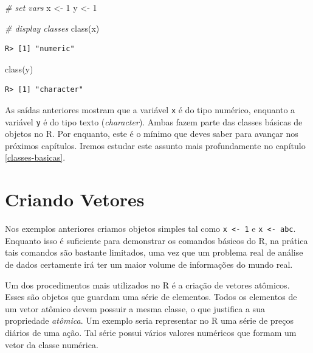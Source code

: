 \documentclass[
  11pt,
]{book}
\newenvironment{Shaded}{\begin{snugshade}}{\end{snugshade}}
\newcommand{\CommentTok}[1]{\textcolor[rgb]{0.37,0.37,0.37}{\textit{#1}}}
\newcommand{\DecValTok}[1]{\textcolor[rgb]{0.06,0.06,0.06}{#1}}
\newcommand{\FunctionTok}[1]{\textcolor[rgb]{0,0,0}{#1}}
\newcommand{\NormalTok}[1]{#1}
\newcommand{\OtherTok}[1]{\textcolor[rgb]{0.37,0.37,0.37}{#1}}
\newcommand{\StringTok}[1]{\textcolor[rgb]{0.5,0.5,0.5}{#1}}
\begin{document}
\begin{Shaded}
\begin{Highlighting}[]
\CommentTok{\# set vars}
\NormalTok{x }\OtherTok{\textless{}{-}} \DecValTok{1}
\NormalTok{y }\OtherTok{\textless{}{-}} \StringTok{\textquotesingle{}1\textquotesingle{}}

\CommentTok{\# display classes}
\FunctionTok{class}\NormalTok{(x)}
\end{Highlighting}
\end{Shaded}

\begin{verbatim}
R> [1] "numeric"
\end{verbatim}

\begin{Shaded}
\begin{Highlighting}[]
\FunctionTok{class}\NormalTok{(y)}
\end{Highlighting}
\end{Shaded}

\begin{verbatim}
R> [1] "character"
\end{verbatim}

As saídas anteriores mostram que a variável \texttt{x} é do tipo numérico, enquanto a variável \texttt{y} é do tipo texto (\emph{character}). Ambas fazem parte das classes básicas de objetos no R. Por enquanto, este é o mínimo que deves saber para avançar nos próximos capítulos. Iremos estudar este assunto mais profundamente no capítulo \ref{classes-basicas}. 

\hypertarget{criando-vetores}{%
\section{Criando Vetores}\label{criando-vetores}}

Nos exemplos anteriores criamos objetos simples tal como \texttt{x\ \textless{}-\ 1} e \texttt{x\ \textless{}-\ \textquotesingle{}abc\textquotesingle{}}. Enquanto isso é suficiente para demonstrar os comandos básicos do R, na prática tais comandos são bastante limitados, uma vez que um problema real de análise de dados certamente irá ter um maior volume de informações do mundo real.

Um dos procedimentos mais utilizados no R é a criação de vetores atômicos. Esses são objetos que guardam uma série de elementos. Todos os elementos de um vetor atômico devem possuir a mesma classe, o que justifica a sua propriedade \emph{atômica}. Um exemplo seria representar no R uma série de preços diários de uma ação. Tal série possui vários valores numéricos que formam um vetor da classe numérica.
\end{document}
